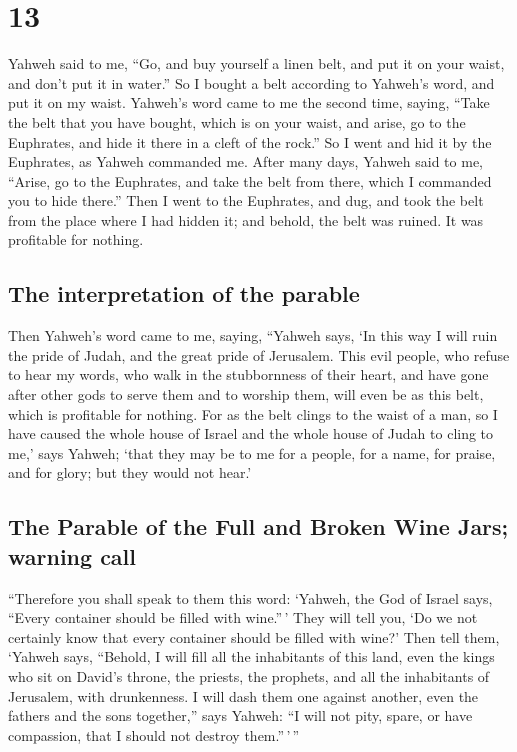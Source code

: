 \hypertarget{section-12}{%
\section{13}\label{section-12}}

 Yahweh said to me, ``Go, and buy yourself a linen belt,
and put it on your waist, and don't put it in water.''  So
I bought a belt according to Yahweh's word, and put it on my waist.
 Yahweh's word came to me the second time, saying,
 ``Take the belt that you have bought, which is on your
waist, and arise, go to the Euphrates, and hide it there in a cleft of
the rock.''  So I went and hid it by the Euphrates, as
Yahweh commanded me.  After many days, Yahweh said to me,
``Arise, go to the Euphrates, and take the belt from there, which I
commanded you to hide there.''  Then I went to the
Euphrates, and dug, and took the belt from the place where I had hidden
it; and behold, the belt was ruined. It was profitable for nothing.

\hypertarget{the-interpretation-of-the-parable}{%
\subsection{The interpretation of the
parable}\label{the-interpretation-of-the-parable}}

 Then Yahweh's word came to me, saying, 
``Yahweh says, `In this way I will ruin the pride of Judah, and the
great pride of Jerusalem.  This evil people, who refuse
to hear my words, who walk in the stubbornness of their heart, and have
gone after other gods to serve them and to worship them, will even be as
this belt, which is profitable for nothing.  For as the
belt clings to the waist of a man, so I have caused the whole house of
Israel and the whole house of Judah to cling to me,' says Yahweh; `that
they may be to me for a people, for a name, for praise, and for glory;
but they would not hear.'

\hypertarget{the-parable-of-the-full-and-broken-wine-jars-warning-call}{%
\subsection{The Parable of the Full and Broken Wine Jars; warning
call}\label{the-parable-of-the-full-and-broken-wine-jars-warning-call}}

 ``Therefore you shall speak to them this word: `Yahweh,
the God of Israel says, ``Every container should be filled with
wine.''\,' They will tell you, `Do we not certainly know that every
container should be filled with wine?'  Then tell them,
`Yahweh says, ``Behold, I will fill all the inhabitants of this land,
even the kings who sit on David's throne, the priests, the prophets, and
all the inhabitants of Jerusalem, with drunkenness.  I
will dash them one against another, even the fathers and the sons
together,'' says Yahweh: ``I will not pity, spare, or have compassion,
that I should not destroy them.''\,'\,''

